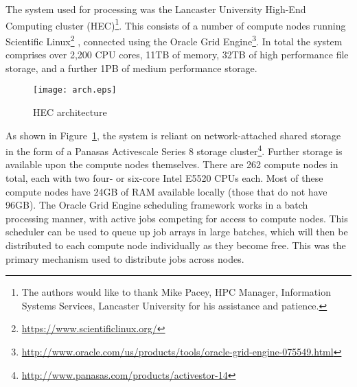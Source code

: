 The system used for processing was the Lancaster University High-End Computing cluster (HEC)\footnote{The authors would like to thank Mike Pacey, HPC Manager, Information Systems Services, Lancaster University for his assistance and patience.}.  This consists of a number of compute nodes running Scientific Linux\footnote{\url{https://www.scientificlinux.org/}}%
, connected using the Oracle Grid Engine\footnote{\url{http://www.oracle.com/us/products/tools/oracle-grid-engine-075549.html}}.  
In total the system comprises over 2,200 CPU cores, 11TB of memory, 32TB of high performance file storage, and a further 1PB of medium performance storage.


\begin{figure}[h]
   \centering
   \texttt{[image: arch.eps]}
   \caption{HEC architecture}
\label{fig:arch}
\end{figure}

As shown in Figure~\ref{fig:arch}, the system is reliant on network-attached shared storage in the form of a Panasas Activescale Series 8 storage cluster\footnote{\url{http://www.panasas.com/products/activestor-14}}\cite{Nagle2004PAS1048933.1049998}.  Further storage is available upon the compute nodes themselves.
There are 262 compute nodes in total, each with two four- or six-core Intel E5520 CPUs each.  Most of these compute nodes have 24GB of RAM available locally (those that do not have 96GB).
The Oracle Grid Engine scheduling framework works in a batch processing manner, with active jobs competing for access to compute nodes.  This scheduler can be used to queue up job arrays in large batches, which will then be distributed to each compute node individually as they become free.  This was the primary mechanism used to distribute jobs across nodes.

